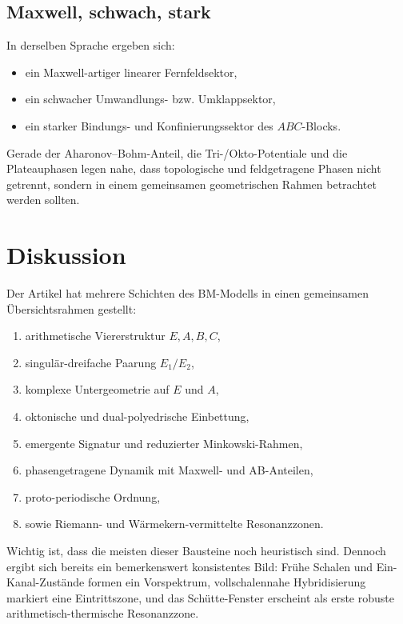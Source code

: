 \documentclass[11pt,a4paper]{article}
\theoremstyle{definition}
\theoremstyle{plain}
\begin{document}
	\subsection{Maxwell, schwach, stark}
	
	In derselben Sprache ergeben sich:
	\begin{itemize}[leftmargin=2em]
		\item ein Maxwell-artiger linearer Fernfeldsektor,
		\item ein schwacher Umwandlungs- bzw. Umklappsektor,
		\item ein starker Bindungs- und Konfinierungssektor des $ABC$-Blocks.
	\end{itemize}
	
	Gerade der Aharonov--Bohm-Anteil, die Tri-/Okto-Potentiale und die Plateauphasen legen nahe, dass topologische und feldgetragene Phasen nicht getrennt, sondern in einem gemeinsamen geometrischen Rahmen betrachtet werden sollten.
	
	\section{Diskussion}
	
	Der Artikel hat mehrere Schichten des BM-Modells in einen gemeinsamen Übersichtsrahmen gestellt:
	\begin{enumerate}[leftmargin=2em]
		\item arithmetische Viererstruktur $E,A,B,C$,
		\item singulär-dreifache Paarung $E_1/E_2$,
		\item komplexe Untergeometrie auf $E$ und $A$,
		\item oktonische und dual-polyedrische Einbettung,
		\item emergente Signatur und reduzierter Minkowski-Rahmen,
		\item phasengetragene Dynamik mit Maxwell- und AB-Anteilen,
		\item proto-periodische Ordnung,
		\item sowie Riemann- und Wärmekern-vermittelte Resonanzzonen.
	\end{enumerate}
	
	Wichtig ist, dass die meisten dieser Bausteine noch heuristisch sind. Dennoch ergibt sich bereits ein bemerkenswert konsistentes Bild: Frühe Schalen und Ein-Kanal-Zustände formen ein Vorspektrum, vollschalennahe Hybridisierung markiert eine Eintrittszone, und das Schütte-Fenster erscheint als erste robuste arithmetisch-thermische Resonanzzone.
	
\end{document}
